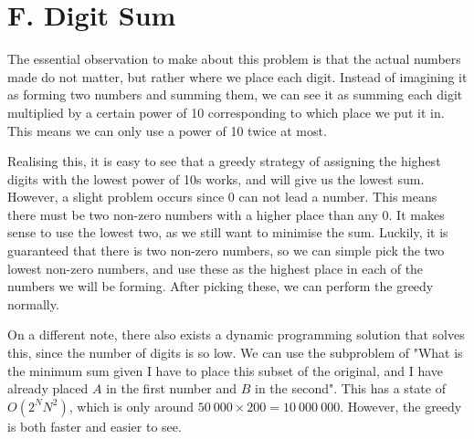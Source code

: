 \section*{F. Digit Sum}

The essential observation to make about this problem is that the actual numbers made do not matter, but rather where we place each digit. Instead of imagining it as forming two numbers and summing them, we can see it as summing each digit multiplied by a certain power of 10 corresponding to which place we put it in. This means we can only use a power of 10 twice at most.

Realising this, it is easy to see that a greedy strategy of assigning the highest digits with the lowest power of 10s works, and will give us the lowest sum. However, a slight problem occurs since 0 can not lead a number. This means there must be two non-zero numbers with a higher place than any 0. It makes sense to use the lowest two, as we still want to minimise the sum. Luckily, it is guaranteed that there is two non-zero numbers, so we can simple pick the two lowest non-zero numbers, and use these as the highest place in each of the numbers we will be forming. After picking these, we can perform the greedy normally.

On a different note, there also exists a dynamic programming solution that solves this, since the number of digits is so low. We can use the subproblem of "What is the minimum sum given I have to place this subset of the original, and I have already placed $A$ in the first number and $B$ in the second". This has a state of $O(2^N N^2)$, which is only around $50\ 000 \times 200 = 10\ 000\ 000$. However, the greedy is both faster and easier to see.